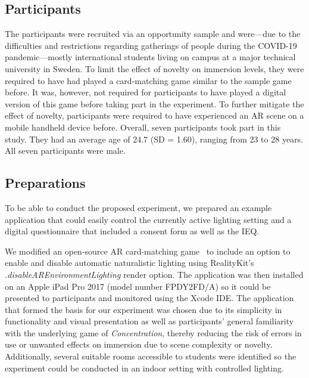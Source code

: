 \documentclass[12pt,twoside,english]{article}
\begin{document}
\subsection{Participants}
\label{sect:participants}

The participants were recruited via an opportunity sample and were---due to the difficulties and restrictions regarding gatherings of people during the COVID-19 pandemic---mostly international students living on campus at a major technical university in Sweden.
To limit the effect of novelty on immersion levels, they were required to have had played a card-matching game similar to the sample game before.
It was, however, not required for participants to have played a digital version of this game before taking part in the experiment.
To further mitigate the effect of novelty, participants were required to have experienced an \gls{AR} scene on a mobile handheld device before.
Overall, seven participants took part in this study.
They had an average age of 24.7 (SD = 1.60), ranging from 23 to 28 years.
All seven participants were male.

\subsection{Preparations}
\label{sect:preparations}

To be able to conduct the proposed experiment, we prepared an example application that could easily control the currently active lighting setting and a digital questionnaire that included a consent form as well as the \gls{IEQ}.

We modified an open-source \gls{AR} card-matching game~\cite{cobb_maxxfrazerrealitykit-cardflip_2020} to include an option to enable and disable automatic naturalistic lighting using RealityKit's \textit{.disableAREnvironmentLighting} render option.
The application was then installed on an Apple iPad Pro 2017 (model number FPDY2FD/A) so it could be presented to participants and monitored using the Xcode \gls{IDE}.
The application that formed the basis for our experiment was chosen due to its simplicity in functionality and visual presentation as well as participants' general familiarity with the underlying game of \textit{Concentration}, thereby reducing the risk of errors in use or unwanted effects on immersion due to scene complexity or novelty.
Additionally, several suitable rooms accessible to students were identified so the experiment could be conducted in an indoor setting with controlled lighting.
\end{document}
